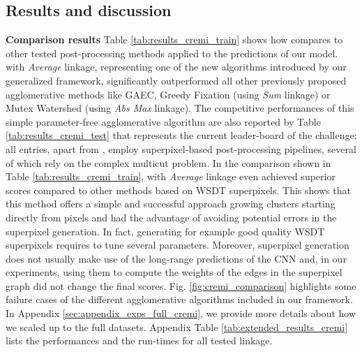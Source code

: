 

\subsection{Results and discussion}\label{sec:results}
\textbf{Comparison results } Table \ref{tab:results_cremi_train} shows how \algname{} compares to other tested post-processing methods applied to the predictions of our model. 
\algname{} with \emph{Average} linkage, representing one of the new algorithms introduced by our generalized framework, significantly outperformed all other previously proposed agglomerative methods like GAEC, Greedy Fixation (using \emph{Sum} linkage) or Mutex Watershed (using \emph{Abs Max} linkage). The competitive performances of this simple parameter-free agglomerative algorithm are also reported by Table \ref{tab:results_cremi_test} that represents the current leader-board of the challenge: all entries, apart from \algname{}, employ superpixel-based post-processing pipelines, several of which rely on the complex multicut problem. 
In the comparison shown in Table \ref{tab:results_cremi_train}, \algname{} with \emph{Average} linkage even achieved superior scores compared to other methods based on WSDT superpixels.
This shows that this method offers a simple and successful approach growing clusters starting directly from pixels and had the advantage of avoiding potential errors in the superpixel generation. In fact, generating for example good quality WSDT superpixels requires to tune several parameters.   
Moreover, superpixel generation does not usually make use of the long-range predictions of the CNN and, in our experiments, using them to compute the weights of the edges in the superpixel graph did not change the final scores.
Fig. \ref{fig:cremi_comparison} highlights some failure cases of the different agglomerative algorithms included in our framework.
In Appendix \ref{sec:appendix_exps_full_cremi}, we provide more details about how we scaled up \algname{} to the full datasets. Appendix Table \ref{tab:extended_results_cremi} lists the performances and the run-times for all tested \algname{} linkage.


